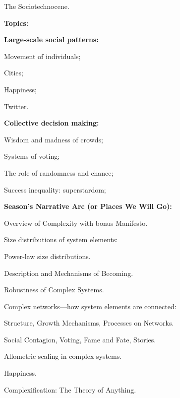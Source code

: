       The Sociotechnocene.
    
  


  \textbf{Topics:}

  \textbf{Large-scale social patterns:}
    
     
      Movement of individuals;
     
      Cities;
     
      Happiness;
     
      Twitter.
    
  

  \textbf{Collective decision making:}
    
     
      Wisdom and madness of crowds;
     
      Systems of voting;
     
      The role of randomness and chance;
     
      Success inequality: superstardom;
    
  





  \textbf{Season's Narrative Arc (or Places We Will Go):}
    
    
      Overview of Complexity with bonus Manifesto.
    
      Size distributions of system elements:
      
      
        Power-law size distributions.
      
        Description and Mechanisms of Becoming.
      
     
      Robustness of Complex Systems.
     
      Complex networks---how system elements are connected:
      
       
        Structure, Growth Mechanisms, Processes on Networks.
       
        Social Contagion, Voting, Fame and Fate, Stories.
      
    
      Allometric scaling in complex systems.
    
      Happiness.
    
      Complexification: The Theory of Anything.
    
  


